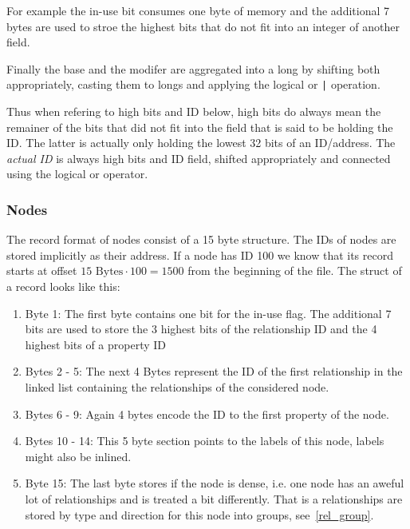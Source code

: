 \documentclass[a4paper,10pt]{article}
\begin{document}
    For example the in-use bit consumes one byte of memory and the additional 7 bytes are used to stroe the highest bits that do not fit into an integer of another field.
    
    Finally the base and the modifer are aggregated into a long by shifting both appropriately, casting them to longs and applying the logical or \texttt{|} operation.
    
    Thus when refering to high bits and ID below, high bits do always mean the remainer of the bits that did not fit into the field that is said to be holding the ID. The latter is actually only holding the lowest 32 bits of an ID/address. The \textit{actual ID} is always high bits and ID field, shifted appropriately and connected using the logical or operator.
    
    \subsubsection{Nodes}
    The record format of nodes consist of a 15 byte structure. The IDs of nodes are stored implicitly as their address. If a node has ID 100 we know that its record starts at offset $15 \text{ Bytes} \cdot 100 = 1500$ from the beginning of the file. The struct of a record looks like this:
    \begin{enumerate}
     \item Byte 1: The first byte contains one bit for the in-use flag. The additional 7 bits are used to store the 3 highest bits of the relationship ID and the 4 highest bits of a property ID
     \item Bytes 2 - 5: The next 4 Bytes represent the ID of the first relationship in the linked list containing the relationships of the considered node.
     \item Bytes 6 - 9: Again 4 bytes encode the ID to the first property of the node.
     \item Bytes 10 - 14: This 5 byte section points to the labels of this node, labels might also be inlined.
     \item Byte 15: The last byte stores if the node is dense, i.e. one node has an aweful lot of relationships and is treated a bit differently. That is a relationships are stored by type and direction for this node into groups, see~\ref{rel_group}.
    \end{enumerate}
    
\end{document}
